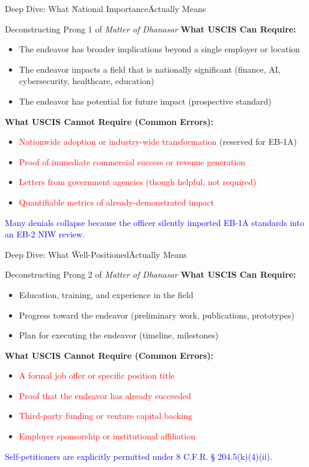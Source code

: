 \documentclass[11pt]{beamer}
\begin{document}
	\begin{frame}{Deep Dive: What \"National Importance\" Actually Means}
		\scriptsize
		\begin{block}{Deconstructing Prong 1 of \textit{Matter of Dhanasar}}
			\textbf{What USCIS Can Require:}
			\begin{itemize}
				\item The endeavor has broader implications beyond a single employer or location
				\item The endeavor impacts a field that is nationally significant (finance, AI, cybersecurity, healthcare, education)
				\item The endeavor has potential for future impact (prospective standard)
			\end{itemize}
			\textbf{What USCIS Cannot Require (Common Errors):}
			\begin{itemize}
				\item \textcolor{red}{Nationwide adoption or industry-wide transformation} (reserved for EB-1A)
				\item \textcolor{red}{Proof of immediate commercial success or revenue generation}
				\item \textcolor{red}{Letters from government agencies (though helpful, not required)}
				\item \textcolor{red}{Quantifiable metrics of already-demonstrated impact}
			\end{itemize}
			\textcolor{blue}{Many denials collapse because the officer silently imported EB-1A standards into an EB-2 NIW review.}
		\end{block}
	\end{frame}
	
	\begin{frame}{Deep Dive: What \"Well-Positioned\" Actually Means}
		\scriptsize
		\begin{block}{Deconstructing Prong 2 of \textit{Matter of Dhanasar}}
			\textbf{What USCIS Can Require:}
			\begin{itemize}
				\item Education, training, and experience in the field
				\item Progress toward the endeavor (preliminary work, publications, prototypes)
				\item Plan for executing the endeavor (timeline, milestones)
			\end{itemize}
			\textbf{What USCIS Cannot Require (Common Errors):}
			\begin{itemize}
				\item \textcolor{red}{A formal job offer or specific position title}
				\item \textcolor{red}{Proof that the endeavor has already succeeded}
				\item \textcolor{red}{Third-party funding or venture capital backing}
				\item \textcolor{red}{Employer sponsorship or institutional affiliation}
			\end{itemize}
			\textcolor{blue}{Self-petitioners are explicitly permitted under 8 C.F.R. § 204.5(k)(4)(ii).}
		\end{block}
	\end{frame}
	
\end{document}
